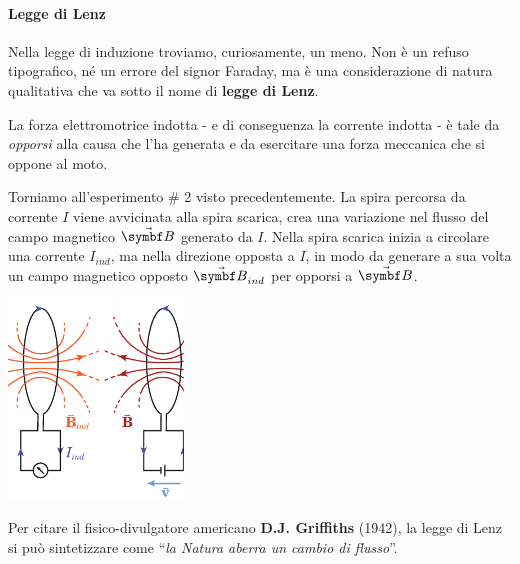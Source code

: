 \paragraph{Legge di Lenz}
Nella legge di induzione troviamo, curiosamente, un meno. Non è un refuso tipografico, né un errore del signor Faraday, ma è una considerazione di natura qualitativa che va sotto il nome di \textbf{legge di Lenz}.
\begin{corollaryqed}
	La forza elettromotrice indotta - e di conseguenza la corrente indotta - è tale da \textit{opporsi} alla causa che l'ha generata e da esercitare una forza meccanica che si oppone al moto. 
\end{corollaryqed}
\begin{observe}
	Torniamo all'esperimento \# 2 visto precedentemente. La spira percorsa da corrente $I$ viene avvicinata alla spira scarica, crea una variazione nel flusso del campo magnetico $\vba{B}$ generato da $I$. Nella spira scarica inizia a circolare una corrente $I_{ind}$, ma nella direzione opposta a $I$, in modo da generare a sua volta un campo magnetico opposto $\vba{B}_{ind}$ per opporsi a $\vba{B}$.
	\begin{center}
		\includegraphics[width=0.35\textwidth]{images/chp10/chp10esperimento2aoss.pdf}
	\end{center}
\end{observe}
Per citare il fisico-divulgatore americano \textbf{D.J. Griffiths} (1942), la legge di Lenz si può sintetizzare come ``\textit{la Natura aberra un cambio di flusso}''.
